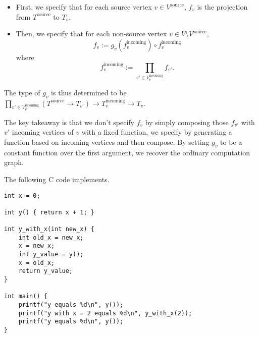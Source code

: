 \documentclass{article}
\begin{document}
\begin{itemize}
	\item First, we specify that for each source vertex $v\in V^{\text{source}}$, $f_v$ is the projection from $T^{\text{source}}$ to $T_v$.
	\item Then, we specify that for each non-source vertex $v\in V\setminus V^{\text{source}}$,
	      \begin{equation}
		      f_v:=g_v(f^{\text{incoming}}_v)\circ f^{\text{incoming}}_v
	      \end{equation}
	      where
	      \begin{equation}
		      f^{\text{incoming}}_v:=\prod_{v'\in V^{\text{incoming}}_v}f_{v'}.
	      \end{equation}
\end{itemize}

The type of $g_v$ is thus determined to be $\prod_{v'\in V^{\text{incoming}}_{v}}(T^{\text{source}} \rightarrow T_{v'})\rightarrow T^{\text{incoming}}_v\rightarrow T_v$.

The key takeaway is that we don't specify $f_v$ by simply composing those $f_{v'}$ with $v'$ incoming vertices of $v$ with a fixed function, we specify by generating a function based on incoming vertices and then compose. By setting $g_v$ to be a constant function over the first argument, we recover the ordinary computation graph.

The following C code implements.
\begin{verbatim}
int x = 0;

int y() { return x + 1; }

int y_with_x(int new_x) {
	int old_x = new_x;
	x = new_x;
	int y_value = y();
	x = old_x;
	return y_value;
}

int main() {
	printf("y equals %d\n", y());
	printf("y with x = 2 equals %d\n", y_with_x(2));
	printf("y equals %d\n", y());
}
\end{verbatim}

\end{document}
